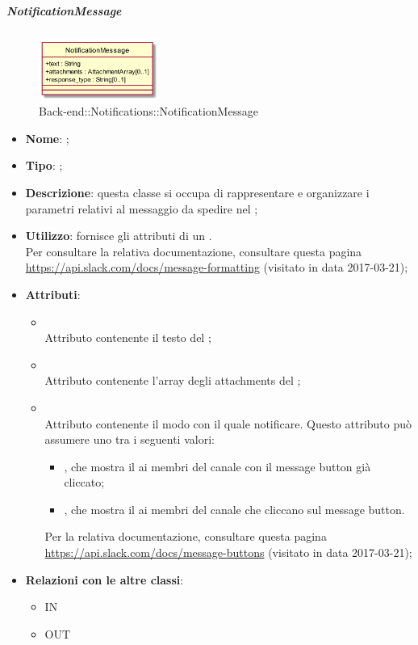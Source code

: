 \hypertarget{NotificationMessage_label}{\subparagraph{NotificationMessage}}
\begin{figure}[h]
	\centering
	\includegraphics[width=0.35\textwidth,height=\textheight,keepaspectratio]{images/ClassNotificationMessage.png}
	\caption{Back-end::Notifications::NotificationMessage}
\end{figure}
\begin{itemize}
	\item \textbf{Nome}: ;
	\item \textbf{Tipo}: ;
	\item \textbf{Descrizione}: questa classe si occupa di rappresentare e organizzare i parametri relativi al messaggio da spedire nel ;
	\item \textbf{Utilizzo}: fornisce gli attributi di un . \\ Per consultare la relativa documentazione, consultare questa pagina \url{https://api.slack.com/docs/message-formatting} (visitato in data 2017-03-21);
	\item \textbf{Attributi}:
	\begin{itemize}
		\item[]  \\
		Attributo contenente il testo del ;
		\item[]  \\
		Attributo contenente l'array degli attachments del ;
		\item[]  \\
		Attributo contenente il modo con il quale notificare.
		Questo attributo può assumere uno tra i seguenti valori:
		\begin{itemize}
			\item {}, che mostra il  ai membri del canale con il message button già cliccato;
			\item {}, che mostra il  ai membri del canale che cliccano sul message button.
		\end{itemize}
		Per la relativa documentazione, consultare questa pagina \url{https://api.slack.com/docs/message-buttons}  (visitato in data 2017-03-21);
	\end{itemize}
	\item \textbf{Relazioni con le altre classi}:
	\begin{itemize}
		\item IN \hyperlink{NotificationService_label}{}
		\item OUT \hyperlink{Attachment_label}{}
	\end{itemize}
\end{itemize}
\FloatBarrier

